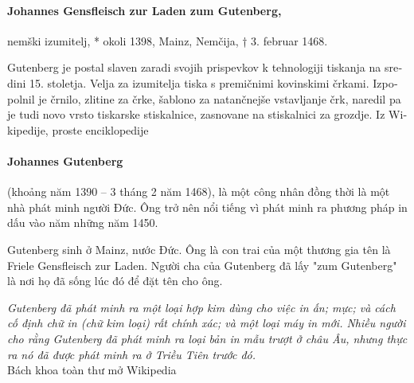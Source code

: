 \documentclass[pagesize,DIV14]{scrartcl}
\begin{document}
\begin{multicols}{2}
\begin{slovenian}
\paragraph*{Johannes Gensfleisch zur Laden zum Gutenberg,} nemški izumitelj, * okoli 1398, Mainz, Nemčija, † 3. februar 1468.\par
Gutenberg je postal slaven zaradi svojih prispevkov k tehnologiji tiskanja na sredini 15. stoletja. Velja za izumitelja tiska s premičnimi kovinskimi črkami. Izpopolnil je črnilo, zlitine za črke, šablono za natančnejše vstavljanje črk, naredil pa je tudi novo vrsto tiskarske stiskalnice, zasnovane na stiskalnici za grozdje.
{\scriptsize Iz Wikipedije, proste enciklopedije}
\end{slovenian}

\begin{vietnamese}
\paragraph*{Johannes Gutenberg} (khoảng năm 1390 – 3 tháng 2 năm 1468), là một công nhân đồng thời là một nhà phát minh người Đức. Ông trở nên nổi tiếng vì phát minh ra phương pháp in dấu vào năm những năm 1450.

Gutenberg sinh ở Mainz, nước Đức. Ông là con trai của một thương gia tên là Friele Gensfleisch zur Laden. Người cha của Gutenberg đã lấy "zum Gutenberg" là nơi họ đã sống lúc đó để đặt tên cho ông.

\textit{Gutenberg đã phát minh ra một loại hợp kim dùng cho việc in ấn; mực; và cách cố định chữ in (chữ kim loại) rất chính xác; và một loại máy in mới. Nhiều người cho rằng Gutenberg đã phát minh ra loại bản in mẫu trượt ở châu Âu, nhưng thực ra nó đã được phát minh ra ở Triều Tiên trước đó.}\\
{\scriptsize Bách khoa toàn thư mở Wikipedia}
\end{vietnamese}

\begin{serbian}

\end{serbian}
\end{multicols}
\end{document}
